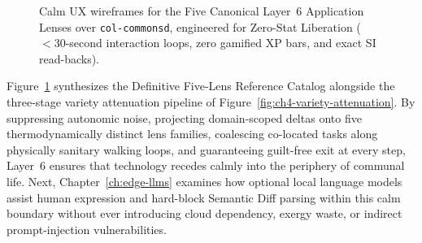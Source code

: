 \begin{figure}[htbp]
{%
}
\caption{Calm UX wireframes for the Five Canonical Layer~6 Application Lenses over \texttt{col-commonsd}, engineered for Zero-Stat Liberation ($<30$-second interaction loops, zero gamified XP bars, and exact SI read-backs).}
\label{fig:ch4-five-lens-wireframes}
\end{figure}

Figure~\ref{fig:ch4-five-lens-wireframes} synthesizes the Definitive Five-Lens Reference Catalog alongside the three-stage variety attenuation pipeline of Figure~\ref{fig:ch4-variety-attenuation}. By suppressing autonomic noise, projecting domain-scoped deltas onto five thermodynamically distinct lens families, coalescing co-located tasks along physically sanitary walking loops, and guaranteeing guilt-free exit at every step, Layer~6 ensures that technology recedes calmly into the periphery of communal life. Next, Chapter~\ref{ch:edge-llms} examines how optional local language models assist human expression and hard-block Semantic Diff parsing within this calm boundary without ever introducing cloud dependency, exergy waste, or indirect prompt-injection vulnerabilities.
